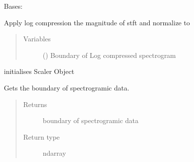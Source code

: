 \documentclass[letterpaper,10pt,english]{sphinxmanual}
\begin{document}
\begin{fulllineitems}
\label{\detokenize{docs/source/preprocess:preprocess.preprocess_tools.Scaler}}
Bases: 

Apply log compression the magnitude of stft and normalize to 
\begin{quote}\begin{description}
\item[{Variables}] \leavevmode
{} () \textendash{} Boundary of Log compressed spectrogram

\end{description}\end{quote}

\begin{fulllineitems}
\label{\detokenize{docs/source/preprocess:preprocess.preprocess_tools.Scaler.___init___}}
initialises Scaler Object

\end{fulllineitems}


\begin{fulllineitems}
\label{\detokenize{docs/source/preprocess:preprocess.preprocess_tools.Scaler.boundary}}
Gets the boundary of spectrogramic data.
\begin{quote}\begin{description}
\item[{Returns}] \leavevmode
boundary of spectrogramic data

\item[{Return type}] \leavevmode
ndarray

\end{description}\end{quote}

\end{fulllineitems}


\end{fulllineitems}
\end{document}
